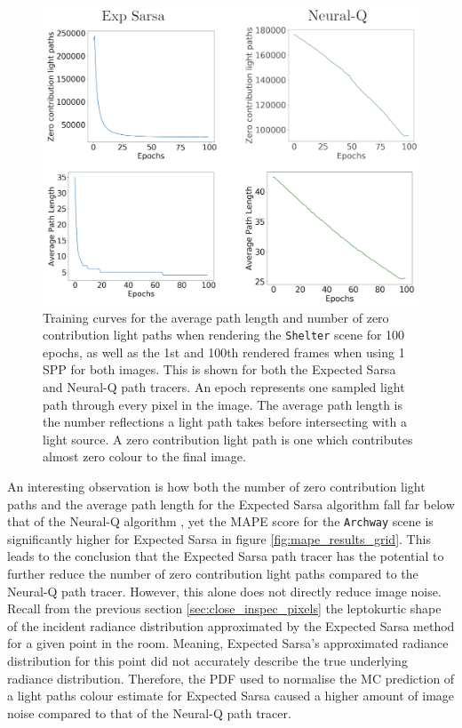 \documentclass[../dissertation.tex]{subfiles}
\begin{document}
\begin{figure}[h]
\begin{center}
\includegraphics[width=\textwidth]{images/training_curves.png}    
\end{center}
\caption{Training curves for the average path length and number of zero contribution light paths when rendering the  \verb|Shelter| scene for 100 epochs, as well as the 1st and 100th rendered frames when using 1 SPP for both images. This is shown for both the Expected Sarsa and Neural-Q path tracers. An epoch represents one sampled light path through every pixel in the image. The average path length is the number reflections a light path takes before intersecting with a light source. A zero contribution light path is one which contributes almost zero colour to the final image.}
\label{fig:training_curves_archway}
\end{figure}

An interesting observation is how both the number of zero contribution light paths and the average path length for the Expected Sarsa algorithm fall far below that of the Neural-Q algorithm , yet the MAPE score for the \verb|Archway| scene is significantly higher for Expected Sarsa in figure \ref{fig:mape_results_grid}. This leads to the conclusion that the Expected Sarsa path tracer has the potential to further reduce the number of zero contribution light paths compared to the Neural-Q path tracer. However, this alone does not directly reduce image noise. Recall from the previous section \ref{sec:close_inspec_pixels} the leptokurtic shape of the incident radiance distribution approximated by the Expected Sarsa method for a given point in the room. Meaning, Expected Sarsa's approximated radiance distribution for this point did not accurately describe the true underlying radiance distribution. Therefore, the PDF used to normalise the MC prediction of a light paths colour estimate for Expected Sarsa caused a higher amount of image noise compared to that of the Neural-Q path tracer.
\end{document}
